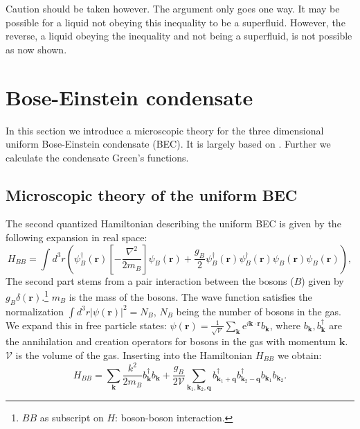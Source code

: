 Caution should be taken however. The argument only goes one way. It may be possible for a liquid not obeying this inequality to be a superfluid. However, the reverse, a liquid obeying the inequality and not being a superfluid, is not possible as now shown. 


\section{Bose-Einstein condensate}
In this section we introduce a microscopic theory for the three dimensional uniform Bose-Einstein condensate (BEC). It is largely based on \cite[chapter 8]{Pethick}. Further we calculate the condensate Green's functions. 

\subsection{Microscopic theory of the uniform BEC}
\label{sec.BEC}
The second quantized Hamiltonian describing the uniform BEC is given by the following expansion in real space: 
\begin{equation}
H_{BB} = \int d^3 r \left(\psi_B^\dagger(\mathbf{r})\left[-\frac{\nabla^2}{2m_B}\right]\psi_B(\mathbf{r}) + \frac{g_B}{2}\psi_B^\dagger(\mathbf{r})\psi_B^\dagger(\mathbf{r})\psi_B(\mathbf{r})\psi_B(\mathbf{r})  \right), 
\label{eq.BECHamiltonianrealspace}
\end{equation}
The second part stems from a pair interaction between the bosons ($B$) given by $g_B\delta(\mathbf{r})$.\footnote{$BB$ as subscript on $H$: boson-boson interaction.} $m_B$ is the mass of the bosons. The wave function satisfies the normalization $\int d^3 r |\psi(\mathbf{r})|^2 = N_B$, $N_B$ being the number of bosons in the gas. We expand this in free particle states: $\psi(\mathbf{r}) = \frac{1}{\sqrt{\mathcal{V}}}\sum_\mathbf{k} \text{e}^{i\mathbf{k}\cdot\mathbf{r}}b_\mathbf{k}$, where $b_\mathbf{k}, b^\dagger_\mathbf{k}$ are the annihilation and creation operators for bosons in the gas with momentum $\mathbf{k}$. $\mathcal{V}$ is the volume of the gas. Inserting into the Hamiltonian $H_{BB}$ we obtain: 
\begin{equation}
H_{BB} = \sum_\mathbf{k} \frac{k^2}{2m_B}b_\mathbf{k}^\dagger b_\mathbf{k} + \frac{g_B}{2\mathcal{V}}\sum_{\mathbf{k}_1,\mathbf{k}_2,\mathbf{q}} b^\dagger_{\mathbf{k}_1+\mathbf{q}}b^\dagger_{\mathbf{k}_2-\mathbf{q}}b_{\mathbf{k}_1}b_{\mathbf{k}_2}. 
\label{eq.BECHamiltonianmomentumspace} 
\end{equation}

